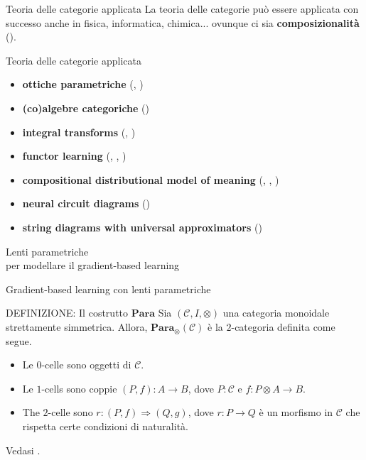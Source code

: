 \documentclass{beamer}
\begin{document}
\begin{frame}{Teoria delle categorie applicata}
    \centering La teoria delle categorie può essere applicata con successo anche in fisica, informatica, chimica... ovunque ci sia \textbf{composizionalità} (\cite{fong2018seven}).
\end{frame}

\begin{frame}{Teoria delle categorie applicata}
    \begin{itemize}
        \item<1-> \textbf{ottiche parametriche} {\footnotesize (\cite{gavranovic2024fundamental}, \cite{cruttwell2022categorical})}
        \item<2-> \textbf{(co)algebre categoriche} {\footnotesize(\cite{gavranovicposition})}
        \item<3-> \textbf{integral transforms} {\footnotesize(\cite{dudzik2022graph}, \cite{dudzik2024asynchronous})}
        \item<4-> \textbf{functor learning} {\footnotesize(\cite{gavranovic2019compositional}, \cite{sheshmani2021categorical}, \cite{chytas2024poolingimagedatasetsmultiple})}
        \item<5-> \textbf{compositional distributional model of meaning} {\footnotesize(\cite{clark2007combining}, \cite{coecke2010mathematical}, \cite{lewis2019compositionality})}
        \item<6-> \textbf{neural circuit diagrams} {\footnotesize(\cite{abbott2023robust})}
        \item<7-> \textbf{string diagrams with universal approximators} {\footnotesize(\cite{khatri2024anatomy})}
    \end{itemize}
\end{frame}

\begin{frame}[standout]
    \huge Lenti parametriche \\\large per modellare il gradient-based learning
\end{frame}

\begin{frame}{Gradient-based learning con lenti parametriche}
    \begin{block}{DEFINIZIONE: Il costrutto $\mathbf{Para}$}
        Sia $(\mathcal{C},I,\otimes)$ una categoria monoidale strettamente simmetrica. Allora, $\mathbf{Para}_{\otimes}(\mathcal{C})$ è la $2$-categoria definita come segue.
        \begin{itemize}
          \item Le $0$-celle sono oggetti di $\mathcal{C}$.
          \item Le $1$-cells sono coppie $(P,f): A \to B$, dove $P : \mathcal{C}$ e $f: P \otimes A \to B$.
          \item The $2$-celle sono $r: (P,f) \Rightarrow (Q,g)$, dove $r: P \to Q$ è un morfismo in $\mathcal{C}$ che rispetta certe condizioni di naturalità.
        \end{itemize}
        Vedasi \cite{gavranovic2024fundamental}.
      \end{block}
\end{frame}
\end{document}
